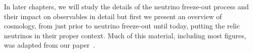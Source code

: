  In later chapters, we will study the details of the neutrino freeze-out process and their impact on observables in detail but first we present an overview of cosmology, from just prior to neutrino freeze-out until today, putting the relic neutrinos in their proper context. Much of this material, including most figures, was adapted from our paper~\cite{ErasOfUniverse}.




